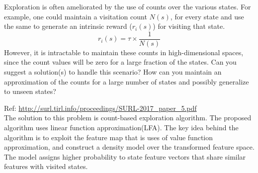 \documentclass[solution,addpoints,12pt]{exam}
\begin{document}
\begin{questions}
\question[4] Exploration is often ameliorated by the use of counts over the various states. For example, one could maintain a visitation count $N(s)$, for every state and use the same to generate an intrinsic reward ($r_i(s)$) for visiting that state.
\[ r_i(s) = \tau \times \frac{1}{N(s)} \]
However, it is intractable to maintain these counts in high-dimensional spaces, since the count values will be zero for a large fraction of the states. Can you suggest a solution(s) to handle this scenario? How can you maintain an approximation of the counts for a large number of states and possibly generalize to unseen states?

\begin{solution}
Ref: \url{http://surl.tirl.info/proceedings/SURL-2017_paper_5.pdf} \\
The solution to this problem is count-based exploration algorithm. The proposed algorithm uses linear function approximation(LFA). 
The key idea behind the algorithm is to exploit the feature map that is uses of value function approximation, and construct a density model over the transformed feature space. The model assigns higher probability to state feature vectors that share similar features with visited states.


\end{solution}
\end{questions}
\end{document}
